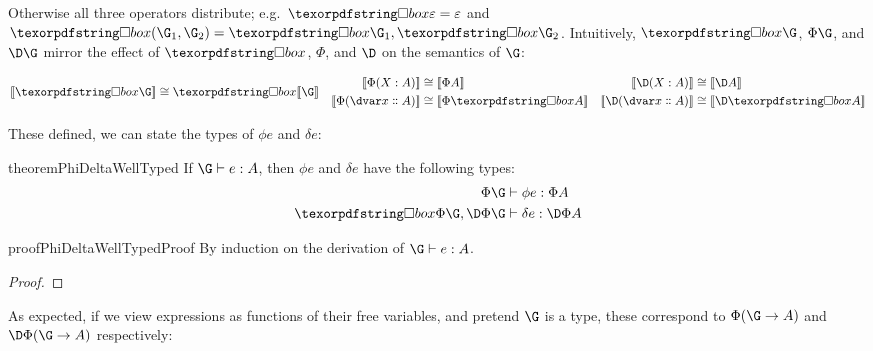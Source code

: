 \noindent
Otherwise all three operators distribute; e.g.\ $\iso\emptycx = \emptycx$ and
$\iso(\G_1,\G_2) = \iso\G_1, \iso\G_2$.
%
Intuitively, $\iso\G$, $\Phi\G$, and $\D\G$ mirror the effect of
$\iso$, $\Phi$, and $\D$ on the semantics of $\G$:

\begin{align*}
  \den{\iso\G} &\cong \iso\den\G
  &
  \begin{aligned}
    \den{\Phi(\hm x A)} &\cong \den{\Phi A}
    \\
    \den{\Phi(\hd x A)} &\cong \den{\Phi \iso A}
  \end{aligned}
  &&
  \begin{aligned}
    \den{\D(\hm x A)} &\cong \den{\D A}
    \\
    \den{\D(\hd x A)} &\cong \den{\D \iso A}
  \end{aligned}
\end{align*}


\noindent
These defined, we can state the types of $\phi e$ and $\delta e$:

\begin{restatable}{theorem}{PhiDeltaWellTyped}
  \label{theorem-phi-delta-well-typed}
  If\/ $\J e \G A$, then $\phi e$ and $\delta e$ have the following types:
  \begin{align*}
    \Jalign {\phi e} {\Phi\G} {\Phi A}\\
    \Jalign {\delta e} {\iso{\Phi\G}, \DP\G} {\DP A}
  \end{align*}
\end{restatable}

\begin{restatable}{proof}{PhiDeltaWellTypedProof}
  By induction on the derivation of $\J e \G A$.
\end{restatable}

\begin{proof}
\end{proof}

\noindent As expected, if we view expressions as functions of their free
variables, and pretend $\G$ is a type, these correspond to $\Phi(\G \to A)$
and $\DP(\G \to A)$ respectively:

